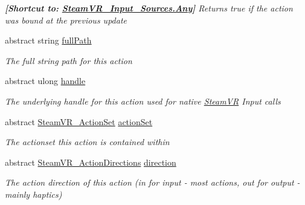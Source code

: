 \begin{DoxyCompactItemize}
\begin{DoxyCompactList}\small\item\em {\bfseries{\mbox{[}Shortcut to\+: \mbox{\hyperlink{namespace_valve_1_1_v_r_a82e5bf501cc3aa155444ee3f0662853faed36a1ef76a59ee3f15180e0441188ad}{Steam\+V\+R\+\_\+\+Input\+\_\+\+Sources.\+Any}}\mbox{]}}} Returns true if the action was bound at the previous update \end{DoxyCompactList}\item 
abstract string \mbox{\hyperlink{class_valve_1_1_v_r_1_1_steam_v_r___action_a7e982d8e80fc65827cce3b141e360413}{full\+Path}}
\begin{DoxyCompactList}\small\item\em The full string path for this action \end{DoxyCompactList}\item 
abstract ulong \mbox{\hyperlink{class_valve_1_1_v_r_1_1_steam_v_r___action_abfacc5556f01d13474d68dff1b649b64}{handle}}
\begin{DoxyCompactList}\small\item\em The underlying handle for this action used for native \mbox{\hyperlink{class_valve_1_1_v_r_1_1_steam_v_r}{Steam\+VR}} Input calls \end{DoxyCompactList}\item 
abstract \mbox{\hyperlink{class_valve_1_1_v_r_1_1_steam_v_r___action_set}{Steam\+V\+R\+\_\+\+Action\+Set}} \mbox{\hyperlink{class_valve_1_1_v_r_1_1_steam_v_r___action_a136c44b47df0a9380c4488059b125fd3}{action\+Set}}
\begin{DoxyCompactList}\small\item\em The actionset this action is contained within \end{DoxyCompactList}\item 
abstract \mbox{\hyperlink{namespace_valve_1_1_v_r_a1e6192cb5ddaf204afab87ccb5728780}{Steam\+V\+R\+\_\+\+Action\+Directions}} \mbox{\hyperlink{class_valve_1_1_v_r_1_1_steam_v_r___action_aa47ba3da1a7fa07d5f4d70fcae84f778}{direction}}
\begin{DoxyCompactList}\small\item\em The action direction of this action (in for input -\/ most actions, out for output -\/ mainly haptics) \end{DoxyCompactList}\item 

\end{DoxyCompactItemize}

